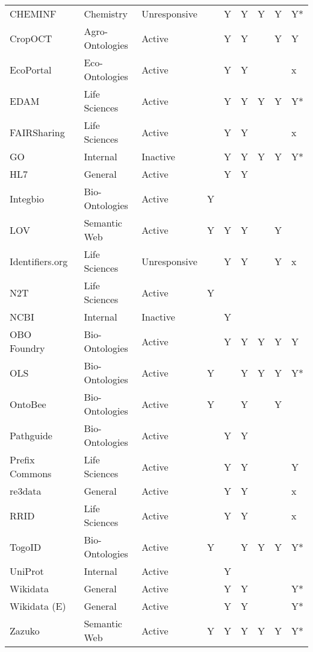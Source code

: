 \begin{table}
\begin{tabular}{lllllllll}
CHEMINF~\cite{Hastings2011} & Chemistry & Unresponsive &  & Y & Y & Y & Y & Y* \\
CropOCT~\cite{Arnaud2020} & Agro-Ontologies & Active &  & Y & Y &  & Y & Y \\
EcoPortal~\cite{Kechagioglou2021} & Eco-Ontologies & Active &  & Y & Y &  &  & x \\
EDAM~\cite{Ison2013} & Life Sciences & Active &  & Y & Y & Y & Y & Y* \\
FAIRSharing~\cite{Sansone2019} & Life Sciences & Active &  & Y & Y &  &  & x \\
GO~\cite{TheGeneOntologyConsortium2019} & Internal & Inactive &  & Y & Y & Y & Y & Y* \\
HL7~\cite{Bender2013} & General & Active &  & Y & Y &  &  &  \\
Integbio & Bio-Ontologies & Active & Y &  &  &  &  &  \\
LOV & Semantic Web & Active & Y & Y & Y &  & Y &  \\
Identifiers.org~\cite{Juty2012} & Life Sciences & Unresponsive &  & Y & Y &  & Y & x \\
N2T~\cite{Wimalaratne2018} & Life Sciences & Active & Y &  &  &  &  &  \\
NCBI~\cite{Clark2016} & Internal & Inactive &  & Y &  &  &  &  \\
OBO Foundry~\cite{Jackson2021} & Bio-Ontologies & Active &  & Y & Y & Y & Y & Y \\
OLS~\cite{Cote2006a} & Bio-Ontologies & Active & Y &  & Y & Y & Y & Y* \\
OntoBee~\cite{Ong2017} & Bio-Ontologies & Active & Y &  & Y &  & Y &  \\
Pathguide & Bio-Ontologies & Active &  & Y & Y &  &  &  \\
Prefix Commons~\cite{prefixcommons} & Life Sciences & Active &  & Y & Y &  &  & Y \\
re3data~\cite{Pampel2013} & General & Active &  & Y & Y &  &  & x \\
RRID & Life Sciences & Active &  & Y & Y &  &  & x \\
TogoID & Bio-Ontologies & Active & Y &  & Y & Y & Y & Y* \\
UniProt~\cite{Bateman2021} & Internal & Active &  & Y &  &  &  &  \\
Wikidata~\cite{Waagmeester2020} & General & Active &  & Y & Y &  &  & Y* \\
Wikidata (E)~\cite{Waagmeester2020} & General & Active &  & Y & Y &  &  & Y* \\
Zazuko & Semantic Web & Active & Y & Y & Y & Y & Y & Y* \\
\bottomrule
\end{tabular}
\end{table}
